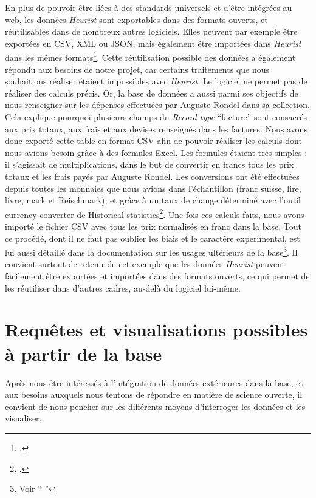 En plus de pouvoir être liées à des standards universels et d'être intégrées au web, les données \emph{Heurist} sont exportables dans des formats ouverts, et réutilisables dans de nombreux autres logiciels. Elles peuvent par exemple être exportées en CSV, XML ou JSON, mais également être importées dans \emph{Heurist} dans les mêmes formats\footcite[Voir \enquote{Présentation de Heurist}]{paillusson_introduction_2022}. Cette réutilisation possible des données a également répondu aux besoins de notre projet, car certains traitements que nous souhaitions réaliser étaient impossibles avec \emph{Heurist}. Le logiciel ne permet pas de réaliser des calculs précis. Or, la base de données a aussi parmi ses objectifs de nous renseigner sur les dépenses effectuées par Auguste Rondel dans sa collection. Cela explique pourquoi plusieurs champs du \emph{Record type} \enquote{facture} sont consacrés aux prix totaux, aux frais et aux devises renseignés dans les factures. Nous avons donc exporté cette table en format CSV afin de pouvoir réaliser les calculs dont nous avions besoin grâce à des formules Excel. Les formules étaient très simples : il s'agissait de multiplications, dans le but de convertir en francs tous les prix totaux et les frais payés par Auguste Rondel. Les conversions ont été effectuées depuis toutes les monnaies que nous avions dans l'échantillon (franc suisse, lire, livre, mark et Reischmark), et grâce à un taux de change déterminé avec l'outil currency converter de Historical statistics\footcite{noauthor_historical_nodate}. Une fois ces calculs faits, nous avons importé le fichier CSV avec tous les prix normalisés en franc dans la base. Tout ce procédé, dont il ne faut pas oublier les biais et le caractère expérimental, est lui aussi détaillé dans la documentation sur les usages ultérieurs de la base\footnote{Voir \enquote{ }}. Il convient surtout de retenir de cet exemple que les données \emph{Heurist} peuvent facilement être exportées et importées dans des formats ouverts, ce qui permet de les réutiliser dans d'autres cadres, au-delà du logiciel lui-même. 

\section{Requêtes et visualisations possibles à partir de la base}

Après nous être intéressés à l'intégration de données extérieures dans la base, et aux besoins auxquels nous tentons de répondre en matière de science ouverte, il convient de nous pencher sur les différents moyens d'interroger les données et les visualiser. 

